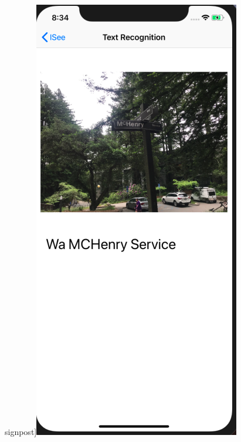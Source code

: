 \documentclass[11pt]{ucscthesis}
\begin{document}
\begin{figure}
signpost]{\includegraphics{Fig/signTextRecognition.png}}
  \hfill

\end{figure}
\end{document}
